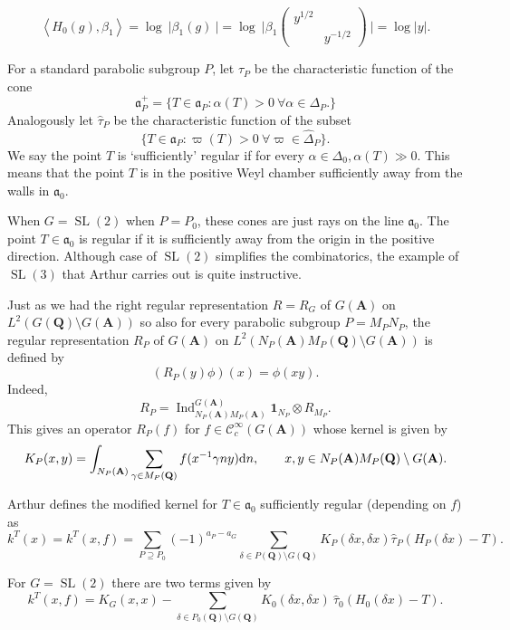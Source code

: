 \documentclass[11pt]{amsart}
\def\apg{a_{P} - a_{G}}
\def\A{\mathbf A}
\def\Q{\mathbf Q}
\def\CCC{\mathcal C}
\def\aaa{\mathfrak a}
\def\d{\text d}
\def\bs{\setminus}
\def\Ind{\operatorname{Ind}}
\def\Ltwo{L^2}
\def\mod#1{\lvert #1 \rvert} %
\def\sl{\operatorname{SL}}
\def\sprod#1#2{\left\langle #1 , #2 \right\rangle}  %
\theoremstyle{remark}
\begin{document}
\[ \sprod{H_0(g)}{\beta_1} = \log \ \mod{\beta_1(g)\ } = \log \ \mod{\beta_1 
			\begin{pmatrix} y^{1/2} & \\ & y^{-1/2} \end{pmatrix} \ } = \log \mod{y}. \]

For a standard parabolic subgroup $P$, let $\tau_P$ be the characteristic function of the cone 
\[ \aaa_P^+ = \{ T \in \aaa_P : \alpha(T) > 0 \ \forall \alpha \in \Delta_P. \} \]
Analogously let $\hat\tau_P$ be the characteristic function of the subset
\[ \{ T \in \aaa_P : \varpi(T) > 0 \ \forall \varpi \in \hat\Delta_P \}. \]
We say the point $T$ is `sufficiently' regular if for every $\alpha \in \Delta_0, \alpha(T) \gg 0$. This means that the point $T$ is in the positive Weyl chamber sufficiently away from the walls in $\aaa_0$. 

When $G = \sl(2)$ when $P = P_0$, these cones are just rays on the line $\aaa_0$. The point $T \in \aaa_0$ is regular if it is sufficiently away from the origin in the positive direction. Although case of $\sl(2)$ simplifies the combinatorics, the example of $\sl(3)$ that Arthur carries out is quite instructive. 

Just as we had the right regular representation $R = R_G$ of $G(\A)$ on $\Ltwo(G(\Q) \bs G(\A))$ so also for every parabolic subgroup $P = M_P N_P$, the regular representation $R_P$ of $G(\A)$ on $\Ltwo(N_P(\A) M_P(\Q) \bs G(\A))$ is defined by 
\[ (R_P(y)\phi)(x) = \phi(xy). \]
Indeed, 
\[ R_P = \Ind_{N_P(\A)M_P(\A)}^{G(\A)} \mathbf 1_{N_P} \otimes R_{M_P}. \]
This gives an operator $R_P(f)$ for $f \in \CCC_c^\infty(G(\A))$ whose kernel is given by
\[ K_P(x, y) = \int_{N_P(\A)} \sum_{\gamma \in M_P(\Q)} f(x^{-1} \gamma n y) \d n, \qquad 
		x, y \in N_P(\A)M_P(\Q)\bs G(\A). \]

Arthur defines the modified kernel for $T \in \aaa_0$ sufficiently regular (depending on $f$) as
\begin{equation} \label{kernel}
	k^T(x) = k^T(x, f) = \sum_{P \supseteq P_0} (-1)^{\apg} \sum_{\delta \in P(\Q) \bs G(\Q)}
		K_P(\delta x, \delta x) \hat\tau_P(H_P(\delta x) - T). 
\end{equation}

For $G = \sl(2)$ there are two terms given by
\begin{equation} \label{k_sl2}
	k^T(x, f) = K_G(x, x) - \sum_{\delta \in P_0(\Q) \bs G(\Q)} K_0(\delta x, \delta x) \ \hat\tau_0(H_0(\delta x) - T).
\end{equation}
\end{document}
